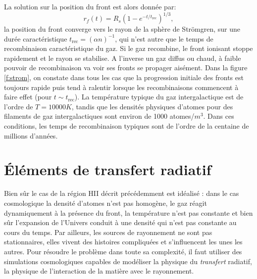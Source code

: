 La solution sur la position du front  est alors donnée par:
\begin{equation}
r_f(t)=R_s(1-e^{-t/t_\mathrm{rec}})^{1/3},
\end{equation}
la position du front converge vers le rayon de la sphère de Strömgren, sur une durée caractéristique $t_\mathrm{rec}=(\alpha n)^{-1}$, qui n'est autre que le temps de recombinaison caractéristique du gaz. Si le gaz recombine, le front ionisant stoppe rapidement et le rayon se stabilise. A l'inverse un gaz diffus ou chaud, à faible pouvoir de recombinaison va voir ses fronts se propager aisément. Dans la figure \ref{f:strom}, on constate dans tous les cas que la progression initiale des fronts est toujours rapide puis tend à ralentir lorsque les recombinaisons commencent à faire effet (pour $t\sim t_\mathrm{rec}$). La température typique du gaz intergalactique est de l'ordre de $T=10 000 K$, tandis que les densités physiques d'atomes pour des filaments de gaz intergalactiques sont environ de 1000 atomes/$m^3$. Dans ces conditions, les temps de recombinaison typiques sont de l'ordre de la centaine de millions d'années.

\section{Éléments de transfert radiatif}

Bien sûr le cas de la région HII décrit précédemment est idéalisé : dans le cas cosmologique la densité d'atomes n'est pas homogène, le gaz réagit dynamiquement à la présence du front, la température n'est pas constante et bien sûr l'expansion de l'Univers conduit à une densité qui n'est pas constante au cours du temps. Par ailleurs, les sources de rayonnement ne sont pas stationnaires, elles vivent des histoires compliquées et s'influencent les unes les autres. Pour résoudre le problème dans toute sa complexité, il faut utiliser des simulations cosmologiques capables de modéliser la physique du \textit{transfert} radiatif, la physique de l'interaction de la matière avec le rayonnement. 

